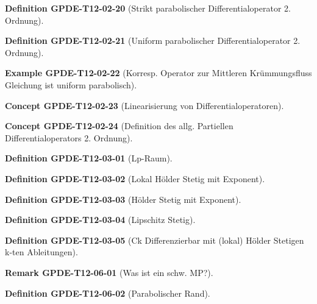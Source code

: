 \documentclass[10pt, letterpaper]{article}
\newcommand{\CustomHeading}[3]{%
  \par\medskip\noindent%
  \textbf{#1 #2} \textnormal{(#3)}.\enskip%
}
\newenvironment{DEF}[2]{\CustomHeading{Definition}{#1}{#2}}{}
\newenvironment{REM}[2]{\CustomHeading{Remark}{#1}{#2}}{}
\newenvironment{EXA}[2]{\CustomHeading{Example}{#1}{#2}}{}
\newenvironment{CONC}[2]{\CustomHeading{Concept}{#1}{#2}}{}
\begin{document}
\begin{DEF}{GPDE-T12-02-20}{Strikt parabolischer Differentialoperator 2. Ordnung}
\end{DEF}

\begin{DEF}{GPDE-T12-02-21}{Uniform parabolischer Differentialoperator 2. Ordnung}
\end{DEF}

\begin{EXA}{GPDE-T12-02-22}{Korresp. Operator zur Mittleren Krümmungsfluss Gleichung ist uniform parabolisch}
\end{EXA}

\begin{CONC}{GPDE-T12-02-23}{Linearisierung von Differentialoperatoren}
\end{CONC}

\begin{CONC}{GPDE-T12-02-24}{Definition des allg. Partiellen Differentialoperators 2. Ordnung}
\end{CONC}

\begin{DEF}{GPDE-T12-03-01}{Lp-Raum}
\end{DEF}

\begin{DEF}{GPDE-T12-03-02}{Lokal Hölder Stetig mit Exponent}
\end{DEF}

\begin{DEF}{GPDE-T12-03-03}{Hölder Stetig mit Exponent}
\end{DEF}

\begin{DEF}{GPDE-T12-03-04}{Lipschitz Stetig}
\end{DEF}

\begin{DEF}{GPDE-T12-03-05}{Ck Differenzierbar mit (lokal) Hölder Stetigen k-ten Ableitungen}
\end{DEF}

\begin{REM}{GPDE-T12-06-01}{Was ist ein schw. MP?}
\end{REM}

\begin{DEF}{GPDE-T12-06-02}{Parabolischer Rand}
\end{DEF}
\end{document}
